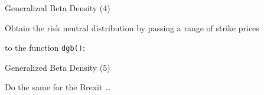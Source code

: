 \begin{frame}[fragile]{Generalized Beta Density (4)}

Obtain the risk neutral distribution by passing a range of strike prices

\begin{Shaded}
\begin{Highlighting}[]
\StringTok{ }\NormalTok{(}\OperatorTok{*}
             \OperatorTok{*}
             \NormalTok{)}
\end{Highlighting}
\end{Shaded}

to the function \texttt{dgb()}:

\begin{Shaded}
\begin{Highlighting}[]
\StringTok{ }
\StringTok{ }\OperatorTok{$}\OperatorTok{$}\OperatorTok{$}\OperatorTok{$}
\end{Highlighting}
\end{Shaded}

\end{frame}

\begin{frame}[fragile]{Generalized Beta Density (5)}

Do the same for the Brexit \ldots{}

\begin{Shaded}
\begin{Highlighting}[]
\StringTok{ }\NormalTok{imp_rd[}\NormalTok{]}
\StringTok{ }\NormalTok{rf[}\NormalTok{]}
\StringTok{ }\NormalTok{spot[}\NormalTok{]}
\StringTok{ }
\StringTok{ }
\StringTok{ }
\StringTok{ }
\end{Highlighting}
\end{Shaded}

\end{frame}

